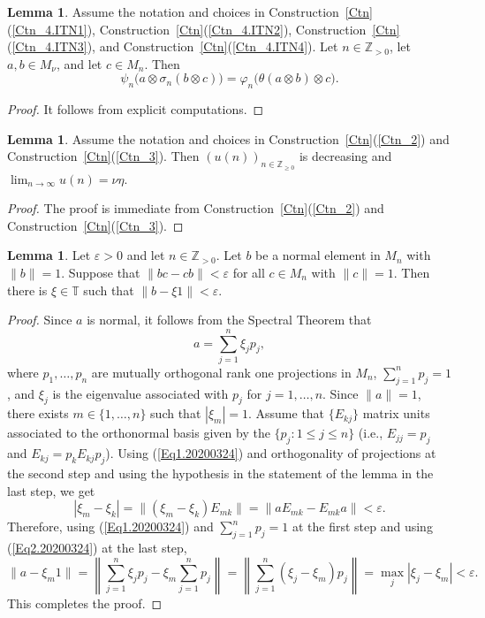 \documentclass[10pt]{amsart}
\numberwithin{equation}{section}
\theoremstyle{definition}
\newtheorem{lem}[thm]{Lemma}
\newcommand{\ep}{\varepsilon}
\newcommand{\N}{{\mathbb{Z}}_{> 0}}
\newcommand{\Nz}{{\mathbb{Z}}_{\geq 0}}
\begin{document}
%
\begin{lem}\label{Lem_Identification}
Assume the notation and choices in
Construction~\ref{Ctn}(\ref{Ctn_4.ITN1}),
Construction~\ref{Ctn}(\ref{Ctn_4.ITN2}), Construction~\ref{Ctn}(\ref{Ctn_4.ITN3}),
and Construction~\ref{Ctn}(\ref{Ctn_4.ITN4}).
Let $n \in \N$, let $a, b\in M_{\nu}$, and let $c\in M_{n}$.
Then 
\[
\psi_n \big(a \otimes \sigma_n \left(b \otimes c\right)\big)
= 
\varphi_n \big(\theta \left(a \otimes b\right) \otimes c\big).
\]
\end{lem}
\begin{proof}
It follows from explicit computations.
\end{proof}

%
\begin{lem}\label{L_Kap_20200325}
Assume the notation and choices in
Construction~\ref{Ctn}(\ref{Ctn_2}) and Construction~\ref{Ctn}(\ref{Ctn_3}).
Then $(u (n))_{n \in \Nz}$ is  decreasing
and $\lim_{n \to \infty} u(n)=\nu \eta$.
\end{lem}
%
\begin{proof}
The proof is immediate from Construction~\ref{Ctn}(\ref{Ctn_2}) and Construction~\ref{Ctn}(\ref{Ctn_3}).
\end{proof}
%
\begin{lem}\label{Approx_Commutnat}
Let $\ep>0$ and  let $n \in \N$. Let $b$ be a normal element in $M_n$ with $\| b \| = 1$.
Suppose that $\| b c - c b\| < \ep$ for all $c \in M_n$ with $\| c \|=1$.
Then there is $\xi \in \mathbb{T}$ such that  $\| b - \xi 1\| < \ep$.
\end{lem}
%
\begin{proof}
Since $a$ is normal, it follows from the Spectral Theorem that 
\begin{equation} \label{Eq1.20200324}
a=\sum_{j=1}^{n} \xi_j p_j, 
\end{equation}
where $p_1, \ldots,p_n$ are mutually orthogonal rank one projections in $M_n$, 
$\sum_{j=1}^{n} p_j=1$, and 
$\xi_j$ is the eigenvalue associated with $p_j$ for $j=1, \dots, n$.
Since $\|a\|=1$, there exists $m \in \{1, \ldots, n\}$ such that $|\xi_{m}|=1$.
 Assume that  $\{E_{kj}\}$ matrix units associated to the orthonormal basis given by the $\{p_j\colon 1 \leq j \leq n\}$ 
 (i.e., $E_{jj}=p_{j}$ and $E_{kj}=p_{k} E_{kj} p_{j}$). 
Using (\ref{Eq1.20200324}) and orthogonality of projections at the second step
 and using the hypothesis in the statement of the lemma in the last step, we get
\begin{equation}\label{Eq2.20200324}
|\xi_{m} - \xi_{k}|= \| (\xi_{m} - \xi_{k}) E_{m k} \|
=
\| a E_{m k} - E_{m k} a \|<\ep.
\end{equation} 
Therefore, using (\ref{Eq1.20200324}) and $\sum_{j=1}^{n} p_j=1$ at the first step 
and using (\ref{Eq2.20200324}) at the last step,
\begin{equation*}
\| a - \xi_{m} 1\|
= \left\|\sum_{j=1}^{n} \xi_j p_j - \xi_{m} \sum_{j=1}^{n} p_j \right\|
= 
\left\|\sum_{j=1}^{n} (\xi_j - \xi_{m})p_j \right\|
=
\max_{j} | \xi_j - \xi_{m} |<\ep.
\end{equation*}
This completes the proof.
\end{proof}
\end{document}
